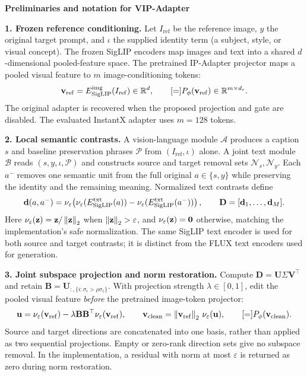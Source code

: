 \textbf{Preliminaries and notation for VIP-Adapter}

\textbf{1. Frozen reference conditioning.}
Let $I_{\mathrm{ref}}$ be the reference image, $y$ the original target prompt, and
$\iota$ the supplied identity term (a subject, style, or visual concept).
The frozen SigLIP encoders map images and text into a shared $d$-dimensional
pooled-feature space. The pretrained IP-Adapter projector maps a pooled visual
feature to $m$ image-conditioning tokens:
\begin{equation}
\vref=\Eimg(I_{\mathrm{ref}})\in\mathbb R^d,\qquad
\Cref=P_{\phi}(\vref)\in\mathbb R^{m\times d_c}.
\end{equation}
The original adapter is recovered when the proposed projection and gate are
disabled. The evaluated InstantX adapter uses $m=128$ tokens.

\textbf{2. Local semantic contrasts.}
A vision-language module $\mathcal A$ produces a caption $s$ and baseline
preservation phrases $\mathcal P$ from $(I_{\mathrm{ref}},\iota)$ alone.
A joint text module $\mathcal B$ reads $(s,y,\iota,\mathcal P)$ and constructs
source and target removal sets $\mathcal N_s,\mathcal N_y$. Each $a^-$ removes
one semantic unit from the full original $a\in\{s,y\}$ while preserving the
identity and the remaining meaning. Normalized text contrasts define
\begin{equation}
\mathbf d(a,a^-)=\nu_{\varepsilon}\!\left(\nu_{\varepsilon}(E_{\mathrm{SigLIP}}^{\mathrm{txt}}(a))-\nu_{\varepsilon}(E_{\mathrm{SigLIP}}^{\mathrm{txt}}(a^-))\right),\qquad
\mathbf D=[\mathbf d_1,\ldots,\mathbf d_M].
\end{equation}
Here $\nu_{\varepsilon}(\mathbf z)=\mathbf z/\left\lVert\mathbf z\right\rVert_2$ when
$\left\lVert\mathbf z\right\rVert_2>\varepsilon$, and $\nu_{\varepsilon}(\mathbf z)=\mathbf 0$ otherwise,
matching the implementation's safe normalization.
The same SigLIP text encoder is used for both source and target contrasts;
it is distinct from the FLUX text encoders used for generation.

\textbf{3. Joint subspace projection and norm restoration.}
Compute $\mathbf D=\mathbf U\Sigma\mathbf V^{\top}$ and retain
$\mathbf B=\mathbf U_{:,\{i:\sigma_i>\rho\sigma_1\}}$.
With projection strength $\lambda\in[0,1]$, edit the pooled visual feature
\emph{before} the pretrained image-token projector:
\begin{equation}
\mathbf u=\unit(\vref)-\lambda\mathbf B\mathbf B^{\top}\unit(\vref),\qquad
\vclean=\norm{\vref}\,\unit(\mathbf u),\qquad
\Cref=P_{\phi}(\vclean).
\end{equation}
Source and target directions are concatenated into one basis, rather than
applied as two sequential projections. Empty or zero-rank direction sets give
no subspace removal. In the implementation, a residual with norm at most
$\varepsilon$ is returned as zero during norm restoration.

